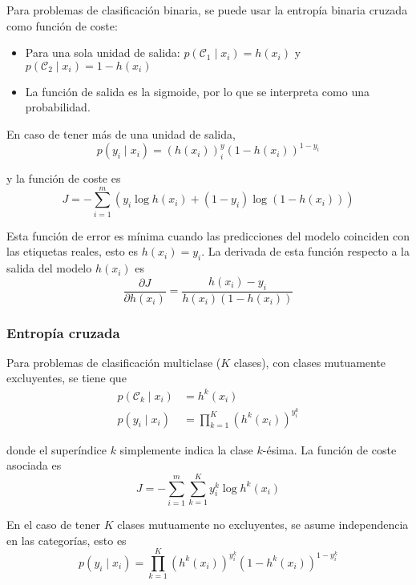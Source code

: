\noindent Para problemas de clasificación binaria, se puede usar la entropía binaria cruzada como función de coste:
\begin{itemize}
\item Para una sola unidad de salida: $p(\mathcal{C}_1 \mid x_i) = h(x_i)$ y $p(\mathcal{C}_2 \mid x_i) = 1 - h(x_i)$
\item La función de salida es la sigmoide, por lo que se interpreta como una probabilidad.
\end{itemize}

\noindent En caso de tener más de una unidad de salida,
\begin{equation}
p(y_i \mid x_i) = (h(x_i))^y_i (1 - h(x_i))^{1 - y_i}
\end{equation}

\noindent y la función de coste es
\begin{equation}
J = -\sum_{i = 1}^m \left(y_i \log h(x_i) + (1 - y_i) \log (1 - h(x_i))\right)
\end{equation}

Esta función de error es mínima cuando las predicciones del modelo coinciden con las etiquetas reales, esto es $h(x_i) = y_i$. La derivada de esta función respecto a la salida del modelo $h(x_i)$ es
\begin{equation}
\frac{\partial J}{\partial h(x_i)} = \frac{h(x_i) - y_i}{h(x_i)(1 - h(x_i))}
\end{equation}

\subsubsection{Entropía cruzada}

\noindent Para problemas de clasificación multiclase ($K$ clases), con clases mutuamente excluyentes, se tiene que 
\begin{align}
p (\mathcal{C}_k \mid x_i) &= h^k(x_i) \\
p (y_i \mid x_i) &= \prod_{k = 1}^K (h^k(x_i))^{y_i^k}
\end{align}

\noindent donde el superíndice $k$ simplemente indica la clase $k$-ésima. La función de coste asociada es 
\begin{equation}
J = -\sum_{i = 1}^m \sum_{k = 1}^K y_i^k \log h^k(x_i)
\end{equation}

En el caso de tener $K$ clases mutuamente no excluyentes, se asume independencia en las categorías, esto es
\begin{equation}
p (y_i \mid x_i) = \prod_{k = 1}^K (h^k(x_i))^{y_i^k} (1 - h^k(x_i))^{1 - y_i^k}
\end{equation}

